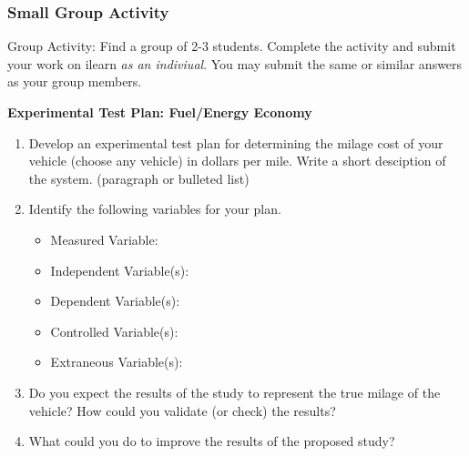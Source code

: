 \documentclass[fleqn]{beamer} %
\newcommand{\sectiontitleV}{Small Group Activity}
\begin{document}
	\begin{frame}[label=sectionV]
		\frametitle{\sectiontitleV}
			\tiny
		
		Group Activity: Find a group of 2-3 students. Complete the activity and submit your work on ilearn {\it as an indiviual}. You may submit the same or similar answers as your group members.	

	        \begin{multicols}{2}
		
		    \textbf{Experimental Test Plan: Fuel/Energy Economy} \\

		    \begin{enumerate}

		    	\item Develop an experimental test plan for determining the milage cost of your vehicle (choose any vehicle) in dollars per mile. Write a short desciption of the system. (paragraph or bulleted list)
			    
			    \vspace{5mm}

			    \item Identify the following variables for your plan.
				
			    \begin{multicols}{2}
				\begin{itemize}\tiny
					\item Measured Variable: 
					\item Independent Variable(s): 
					\item Dependent Variable(s): 
					\item Controlled Variable(s): 
					\item Extraneous Variable(s):
				\end{itemize}
				\end{multicols}	

				\vspace{12mm}

				\item Do you expect the results of the study to represent the true milage of the vehicle? How could you validate (or check) the results?


				\item What could you do to improve the results of the proposed study?

			\end{enumerate}
			
			\end{multicols}	


	\end{frame}
\end{document}
